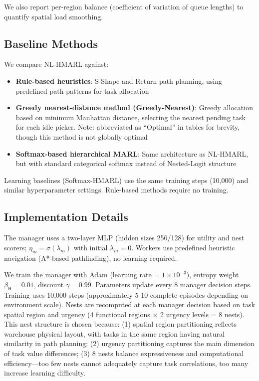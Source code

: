 \documentclass[12pt,a4paper]{article}
\begin{document}
We also report per-region balance (coefficient of variation of queue lengths) to quantify spatial load smoothing.

\subsection{Baseline Methods}

We compare NL-HMARL against:
\begin{itemize}
\item \textbf{Rule-based heuristics}: S-Shape and Return path planning, using predefined path patterns for task allocation
\item \textbf{Greedy nearest-distance method (Greedy-Nearest)}: Greedy allocation based on minimum Manhattan distance, selecting the nearest pending task for each idle picker. Note: abbreviated as ``Optimal'' in tables for brevity, though this method is not globally optimal
\item \textbf{Softmax-based hierarchical MARL}: Same architecture as NL-HMARL, but with standard categorical softmax instead of Nested-Logit structure
\end{itemize}

Learning baselines (Softmax-HMARL) use the same training steps (10,000) and similar hyperparameter settings. Rule-based methods require no training.

\subsection{Implementation Details}

The manager uses a two-layer MLP (hidden sizes 256/128) for utility and nest scorers; $\eta_m = \sigma(\lambda_m)$ with initial $\lambda_m = 0$. Workers use predefined heuristic navigation (A*-based pathfinding), no learning required.

We train the manager with Adam (learning rate = $1 \times 10^{-3}$), entropy weight $\beta_{\mathrm{H}} = 0.01$, discount $\gamma = 0.99$. Parameters update every 8 manager decision steps. Training uses 10,000 steps (approximately 5-10 complete episodes depending on environment scale). Nests are recomputed at each manager decision based on task spatial region and urgency (4 functional regions $\times$ 2 urgency levels = 8 nests). This nest structure is chosen because: (1) spatial region partitioning reflects warehouse physical layout, with tasks in the same region having natural similarity in path planning; (2) urgency partitioning captures the main dimension of task value differences; (3) 8 nests balance expressiveness and computational efficiency---too few nests cannot adequately capture task correlations, too many increase learning difficulty.
\end{document}
